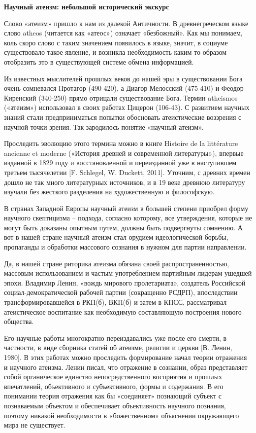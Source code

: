 \textbf{Научный атеизм: небольшой исторический экскурс}

Слово «атеизм» пришло к нам из далекой Античности. В древнегреческом языке слово atheos (читается как «атеос») означает «безбожный». Как мы понимаем, коль скоро слово с таким значением появилось в языке, значит, в социуме существовало такое явление, и возникла необходимость каким-то образом отобразить это в существующей системе обмена информацией.

Из известных мыслителей прошлых веков до нашей эры в существовании Бога очень сомневался Протагор (490-420), а Диагор Мелосский (475-410) и Феодор Киренский (340-250) прямо отрицали существование Бога. Термин atheismos («атеизм») использовал в своих работах Цицерон (106-43). С развитием научных знаний стали предприниматься попытки обосновать атеистические воззрения с научной точки зрения. Так зародилось понятие «научный атеизм».

Проследить эволюцию этого термина можно в книге Histoire de la littérature ancienne et moderne («История древней и современной литературы»), впервые изданной в 1829 году и восстановленной и переизданной уже в наступившем третьем тысячелетии [F. Schlegel, W. Duckett, 2011]. Уточним, с древних времен дошло не так много литературных источников, и в 19 веке древнюю литературу изучали без жесткого разделения на художественную и философскую.

В странах Западной Европы научный атеизм в большей степени приобрел форму научного скептицизма – подхода, согласно которому, все утверждения, которые не могут быть доказаны опытным путем, должны быть подвергнуты сомнению. А вот в нашей стране научный атеизм стал орудием идеологической борьбы, пропаганды и обработки массового сознания в нужном для партии направлении.

Да, в нашей стране риторика атеизма обязана своей распространенностью, массовым использованием и частым употреблением партийным лидерам ушедшей эпохи. Владимир Ленин, «вождь мирового пролетариата», создатель Российской социал-демократической рабочей партии (сокращенно РСДРП), впоследствии трансформировавшейся в РКП(б), ВКП(б) и затем в КПСС, рассматривал атеистическое воспитание как необходимую составляющую построения нового общества.

Его научные работы многократно переиздавались уже после его смерти, в частности, в виде сборника статей об атеизме, религии и церкви [В. Ленин, 1980]. В этих работах можно проследить формирование начал теории отражения и научного атеизма. Ленин писал, что отражение в сознании, образ представляет собой органическое единство непосредственного восприятия и прошлых впечатлений, объективного и субъективного, формы и содержания. В его понимании теория отражения как бы «соединяет» познающий субъект с познаваемым объектом и обеспечивает объективность научного познания, поэтому никакой необходимости в «божественном» объяснении окружающего мира не существует.

